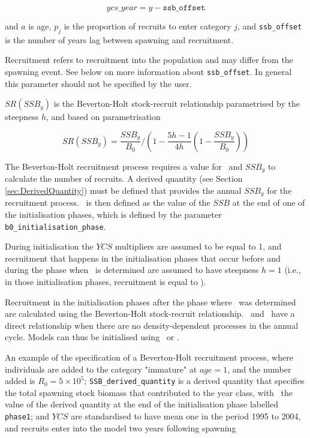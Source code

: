 \begin{equation}\label{eq:year_class}
ycs\_year = y - \texttt{ssb\_offset}
\end{equation}

and $a$ is age, $p_j$ is the proportion of recruits to enter category $j$, and \texttt{ssb\_offset} is the number of years lag between spawning and recruitment.

Recruitment refers to recruitment into the population and may differ from the spawning event. See below on more information about \texttt{ssb\_offset}. In general this parameter should not be specified by the user.

$SR(SSB_y)$ is the Beverton-Holt stock-recruit relationship parametrised by the steepness $h$, and based on \cite{mace_doonan_88} parametrisation

\begin{equation}\label{eq:BH_SR}
SR(SSB_y) = \frac{SSB_y}{B_0} / \left( 1-\frac{5h-1}{4h} \left( 1-\frac{SSB_y}{B_0} \right) \right)
\end{equation}

The Beverton-Holt recruitment process requires a value for \Bzero\ and $SSB_y$ to calculate the number of recruits. A derived quantity (see Section \ref{sec:DerivedQuantity}) must be defined that provides the annual $SSB_y$ for the recruitment process. \Bzero\ is then defined as the value of the $SSB$ at the end of one of the initialisation phases, which is defined by the parameter \texttt{b0\_initialisation\_phase}.

During initialisation the $YCS$ multipliers are assumed to be equal to 1, and recruitment that happens in the initialisation phases that occur before and during the phase when \Bzero\ is determined are assumed to have steepness $h=1$ (i.e., in those initialisation phases, recruitment is equal to \Rzero).

Recruitment in the initialisation phases after the phase where \Bzero\ was determined are calculated using the Beverton-Holt stock-recruit relationship. \Rzero\ and \Bzero\ have a direct relationship when there are no density-dependent processes in the annual cycle. Models can thus be initialised using \Bzero\ or \Rzero.

An example of the specification of a Beverton-Holt recruitment process, where individuals are added to the category "immature" at $age=1$, and the number added is $R_0=5 \times 10^5$; \texttt{SSB\_derived\_quantity} is a derived quantity that specifies the total spawning stock biomass that contributed to the year class, with \Bzero\ the value of the derived quantity at the end of the initialisation phase labelled \texttt{phase1}; and $YCS$ are standardised to have mean one in the period 1995 to 2004, and recruits enter into the model two years following spawning

